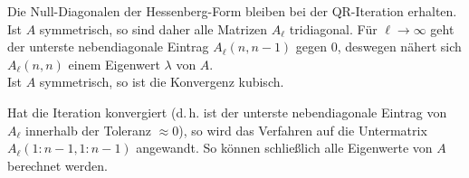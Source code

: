 Die Null-Diagonalen der Hessenberg-Form bleiben bei der QR-Iteration erhalten.
Ist $A$ symmetrisch, so sind daher alle Matrizen $A_\ell$ tridiagonal.
Für $\ell \to \infty$ geht der unterste nebendiagonale Eintrag
$A_\ell(n, n - 1)$ gegen $0$, deswegen nähert sich $A_\ell(n, n)$ einem
Eigenwert $\lambda$ von $A$. \\
Ist $A$ symmetrisch, so ist die Konvergenz kubisch.

Hat die Iteration konvergiert (d.\,h. ist der unterste nebendiagonale Eintrag
von $A_\ell$ innerhalb der Toleranz $\approx 0$), so wird das Verfahren
auf die Untermatrix $A_\ell(1 : n - 1, 1 : n - 1)$ angewandt.
So können schließlich alle Eigenwerte von $A$ berechnet werden.

\pagebreak
